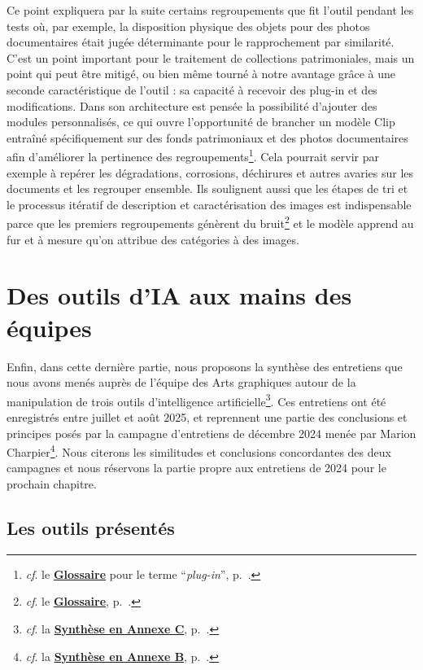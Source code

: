 Ce point expliquera par la suite certains regroupements que fit l'outil pendant les tests où, par exemple, la disposition physique des objets pour des photos documentaires était jugée déterminante pour le rapprochement par similarité. C'est un point important pour le traitement de collections patrimoniales, mais un point qui peut être mitigé, ou bien même tourné à notre avantage grâce à une seconde caractéristique de l'outil : sa capacité à recevoir des plug-in et des modifications. Dans son architecture est pensée la possibilité d'ajouter des modules personnalisés, ce qui ouvre l'opportunité de brancher un modèle Clip entraîné spécifiquement sur des fonds patrimoniaux et des photos documentaires afin d'améliorer la pertinence des regroupements\footnote{\textit{cf}. le \textbf{\hyperref[sec:Glossaire]{Glossaire}} pour le terme \enquote{\textit{plug-in}}, p.~\pageref{sec:Glossaire}.}. Cela pourrait servir par exemple à repérer les dégradations, corrosions, déchirures et autres avaries sur les documents et les regrouper ensemble. Ils soulignent aussi que les étapes de tri et le processus itératif de description et caractérisation des images est indispensable parce que les premiers regroupements génèrent du bruit\footnote{\textit{cf}. le \textbf{\hyperref[sec:Glossaire]{Glossaire}}, p.~\pageref{sec:Glossaire}.} et le modèle apprend au fur et à mesure qu'on attribue des catégories à des images.

\section{Des outils d'IA aux mains des équipes}

Enfin, dans cette dernière partie, nous proposons la synthèse des entretiens que nous avons menés auprès de l'équipe des Arts graphiques autour de la manipulation de trois outils d'intelligence artificielle\footnote{\textit{cf}. la \textbf{\hyperref[sec:Entretiens_2025]{Synthèse en Annexe C}}, p.~\pageref{sec:Entretiens_2025}.}. Ces entretiens ont été enregistrés entre juillet et août 2025, et reprennent une partie des conclusions et principes posés par la campagne d'entretiens de décembre 2024 menée par Marion Charpier\footnote{\textit{cf}. la \textbf{\hyperref[sec:Entretiens_2024]{Synthèse en Annexe B}}, p.~\pageref{sec:Entretiens_2024}.}. Nous citerons les similitudes et conclusions concordantes des deux campagnes et nous réservons la partie propre aux entretiens de 2024 pour le prochain chapitre.

\subsection{Les outils présentés}

